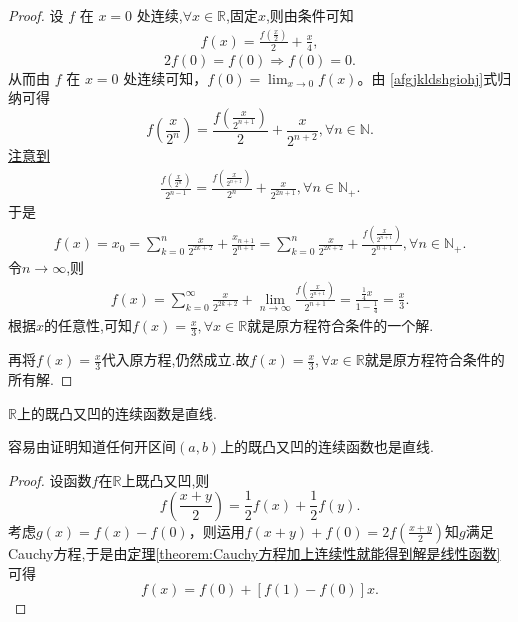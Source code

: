\documentclass[../../main.tex]{subfiles}%
\begin{document}
\begin{proof}
设 \(f\) 在 \(x = 0\) 处连续,$\forall x\in \mathbb{R}$,固定$x$,则由条件可知
\begin{align}
f(x)=\frac{f\left(\frac{x}{2}\right)}{2}+\frac{x}{4}, \label{afgjkldshgiohj}
\end{align}
\[
2f(0)=f(0)\Rightarrow f(0)=0.
\]
从而由 \(f\) 在 \(x = 0\) 处连续可知，\(f(0)=\lim_{x\rightarrow 0}f(x)\)。由 \eqref{afgjkldshgiohj}式归纳可得
\[
f\left(\frac{x}{2^n}\right)=\frac{f\left(\frac{x}{2^{n + 1}}\right)}{2}+\frac{x}{2^{n + 2}},\forall n\in \mathbb{N}.
\]
\hyperlink{注意到的原因见笔记部分123}{注意到}
\begin{align*}
\frac{f\left( \frac{x}{2^n} \right)}{2^{n-1}}=\frac{f\left( \frac{x}{2^{n+1}} \right)}{2^n}+\frac{x}{2^{2n+1}},\forall n\in \mathbb{N} _+.
\end{align*}
于是
\begin{align*}
f\left( x \right) =x_0=\sum_{k=0}^n{\frac{x}{2^{2k+2}}}+\frac{x_{n+1}}{2^{n+1}}=\sum_{k=0}^n{\frac{x}{2^{2k+2}}}+\frac{f\left( \frac{x}{2^{n+1}} \right)}{2^{n+1}},\forall n\in \mathbb{N} _+.
\end{align*}
令$n\rightarrow \infty$,则
\begin{align*}
f\left( x \right) =\sum_{k=0}^{\infty}{\frac{x}{2^{2k+2}}}+\underset{n\rightarrow \infty}{\lim}\frac{f\left( \frac{x}{2^{n+1}} \right)}{2^{n+1}}=\frac{\frac{1}{4}x}{1-\frac{1}{4}}=\frac{x}{3}.
\end{align*}
根据$x$的任意性,可知$f(x)=\frac{x}{3},\forall x\in \mathbb{R}$就是原方程符合条件的一个解.

再将$f(x)=\frac{x}{3}$代入原方程,仍然成立.故$f(x)=\frac{x}{3},\forall x\in \mathbb{R}$就是原方程符合条件的所有解.
\end{proof}

\begin{proposition}\label{proposition:R上的既凸又凹的连续函数是直线}
\(\mathbb{R}\)上的既凸又凹的连续函数是直线.
\end{proposition}
\begin{note}
容易由证明知道任何开区间\((a,b)\)上的既凸又凹的连续函数也是直线.
\end{note}
\begin{proof}
设函数$f$在$\mathbb{R}$上既凸又凹,则
\[
f\left(\frac{x + y}{2}\right)=\frac{1}{2}f(x)+\frac{1}{2}f(y).
\]
考虑\(g(x)=f(x)-f(0)\)，则运用\(f(x + y)+f(0)=2f\left(\frac{x + y}{2}\right)\)知\(g\)满足Cauchy方程,于是由\hyperref[theorem:Cauchy方程加上连续性就能得到解是线性函数]{定理\ref{theorem:Cauchy方程加上连续性就能得到解是线性函数}}可得
\[
f(x)=f(0)+[f(1)-f(0)]x.
\]
\end{proof}
\end{document}
